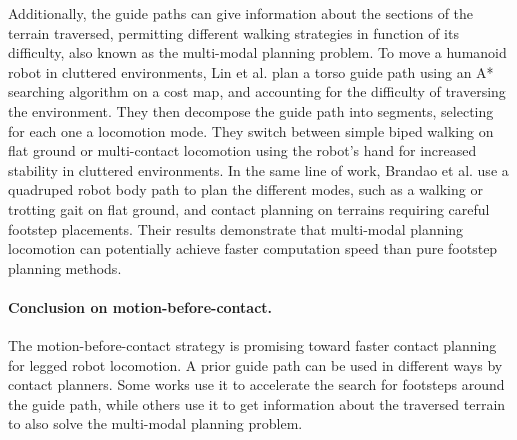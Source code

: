 Additionally, the guide paths can give information about the sections of the terrain traversed, permitting different walking strategies in function of its difficulty, also known as the multi-modal planning problem.
To move a humanoid robot in cluttered environments, Lin et al. \cite{lin_traversability_2018} plan a torso guide path using an A* searching algorithm on a cost map, and accounting for the difficulty of traversing the environment. 
They then decompose the guide path into segments, selecting for each one a locomotion mode. They switch between simple biped walking on flat ground or multi-contact locomotion using the robot's hand for increased stability in cluttered environments.
In the same line of work, Brandao et al. \cite{brandao_multimode_2019} use a quadruped robot body path to plan the different modes, such as a walking or trotting gait on flat ground, and contact planning on terrains requiring careful footstep placements.
Their results demonstrate that multi-modal planning locomotion can potentially achieve faster computation speed than pure footstep planning methods.

\paragraph{Conclusion on motion-before-contact.}

The motion-before-contact strategy is promising toward faster contact planning for legged robot locomotion.
A prior guide path can be used in different ways by contact planners. 
Some works use it to accelerate the search for footsteps around the guide path, while others use it to get information about the traversed terrain to also solve the multi-modal planning problem.

